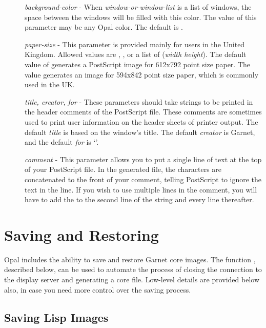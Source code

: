\begin{description}
\item[] {\it background-color} - When {\it window-or-window-list} is a list of windows,
the space between the windows will be filled with this color.  The value of
this parameter may be any Opal color.  The default is .

\item[] {\it paper-size} - This parameter is provided mainly for users in the
United Kingdom.  Allowed values are , , or a list
of ({\it width height}).  The default value of  generates a
PostScript image for 612x792 point size paper.  The  value generates
an image for 594x842 point size paper, which is commonly used in the UK.

\item[] {\it title, creator, for} - These parameters should take strings to be printed
in the header comments of the PostScript file.  These comments are sometimes
used to print user information on the header sheets of printer output.
The default {\it title} is based on the window's title.  The default {\it creator}
is Garnet, and the default {\it for} is `'.

\item[] {\it comment} - This parameter
allows you to put a single line of text at the top of your PostScript file.
In the generated file, the characters  are concatenated to the front
of your comment, telling PostScript to ignore the text in the line.  If you
wish to use multiple lines in the comment, you will have to add the 
to the second line of the string and every line thereafter.

\end{description}


\chapter{Saving and Restoring}
Opal includes the ability to save and restore Garnet core images.
The function , described below, can be used to automate
the process of closing the connection to the display server and generating
a core file.  Low-level details are provided below also, in case you need
more control over the saving process.


\section{Saving Lisp Images}

